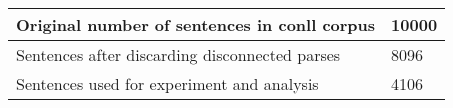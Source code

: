 	\begin{tabular}{|l|l|}
		\hline
		Original number of sentences in conll corpus & 10000\\ 
		\hline
		Sentences after discarding disconnected parses & 8096\\ 
		\hline
		Sentences used for experiment and analysis & 4106\\ 
		\hline
	\end{tabular}
